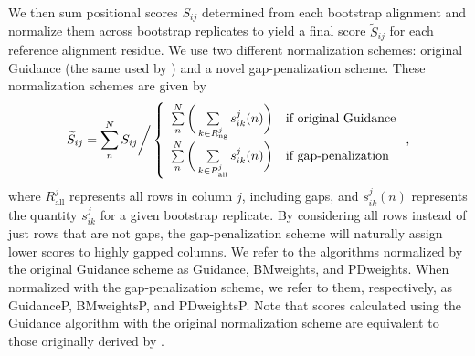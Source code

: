\documentclass[10pt]{article}
\begin{document}
We then sum positional scores $S_{ij}$ determined from each bootstrap alignment and normalize them across bootstrap replicates to yield a final score $\widetilde{S}_{ij}$ for each reference alignment residue. We use two different normalization schemes: original Guidance (the same used by \citet{Penn2010}) and a novel gap-penalization scheme. These normalization schemes are given by
\begin{equation}
\widetilde{S}_{ij}  = \sum_n^N S_{ij} \bigg{/} \left\{ \begin{array}{rl}

              \sum\limits_n^N\bigg{(}\sum\limits_{k \in R_\text{ng}^j}s_{ik}^j(n)\bigg{)}     &\mbox{if original Guidance} \\
              \sum\limits_n^N\bigg{(}\sum\limits_{k \in R_\text{all}^j}s_{ik}^j(n)\bigg{)}     &\mbox{if gap-penalization} \\      
        \end{array} \right.,
\end{equation} 
where $R_\text{all}^j$ represents all rows in column $j$, including gaps, and $s_{ik}^j(n)$ represents the quantity $s_{ik}^j$ for a given bootstrap replicate. By considering all rows instead of just rows that are not gaps, the gap-penalization scheme will naturally assign lower scores to highly gapped columns. We refer to the algorithms normalized by the original Guidance scheme as Guidance, BMweights, and PDweights. When normalized with the gap-penalization scheme, we refer to them, respectively, as GuidanceP, BMweightsP, and PDweightsP. Note that scores calculated using the Guidance algorithm with the original normalization scheme are equivalent to those originally derived by \citet{Penn2010}. 
\end{document}
